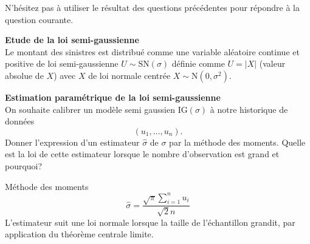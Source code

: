 \documentclass[11pt,addpoints,answers]{exam}
\begin{document}
N'hésitez pas à utiliser le résultat des questions précédentes pour répondre à la question courante.
\begin{questions}
\question \textbf{Etude de la loi semi-gaussienne}\\

Le montant des sinistres est distribué comme une variable aléatoire continue et positive de loi semi-gaussienne $U\sim \text{SN}(\sigma)$ définie comme $U = |X|$ (valeur absolue de $X$) avec $X$ de loi normale centrée $X\sim\text{N}(0,\sigma^2)$.
\question[2] \textbf{Estimation paramétrique de la loi semi-gaussienne}\\

On souhaite calibrer un modèle semi gaussien $\text{IG}(\sigma)$ à notre historique de données
$$(u_1,\ldots, u_n).$$ 
Donner l'expression d'un estimateur $\widehat{\sigma}$ de $\sigma$ par la méthode des moments. Quelle est la loi de cette estimateur lorsque le nombre d'observation est grand et pourquoi?
\begin{solution}
 Méthode des moments 
	$$
\widehat{\sigma} = \frac{\sqrt{\pi}\sum_{i = 1}^n u_i}{\sqrt{2}n}
	$$
L'estimateur suit une loi normale lorsque la taille de l'échantillon grandit, par application du théorème centrale limite.

\end{solution}


\end{questions}
\end{document}
